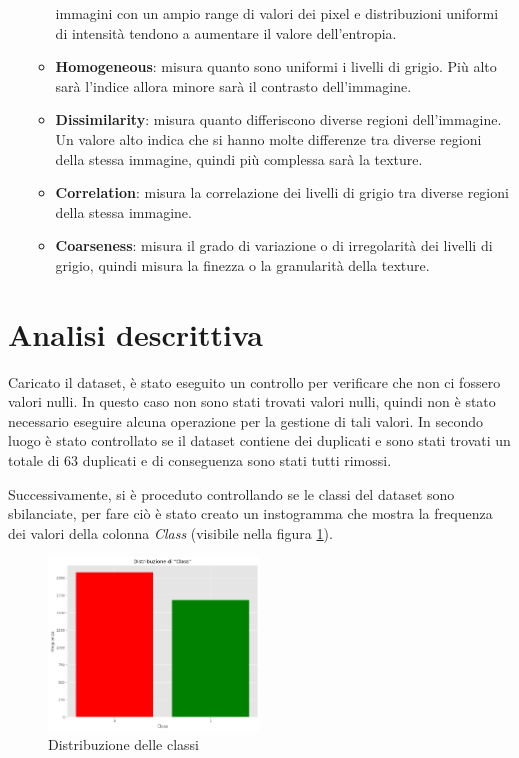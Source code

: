 \begin{enumerate}
\begin{itemize}
                  immagini con un ampio range di valori dei pixel e distribuzioni
                  uniformi di intensità tendono a aumentare il valore dell'entropia.
                  \item \textbf{Homogeneous}: misura quanto sono uniformi i livelli 
                  di grigio. Più alto sarà l'indice allora minore sarà il contrasto 
                  dell'immagine.
                  \item \textbf{Dissimilarity}: misura quanto differiscono diverse 
                  regioni dell'immagine. Un valore alto indica che si hanno molte
                  differenze tra diverse regioni della stessa immagine, quindi più 
                  complessa sarà la texture.
                  \item \textbf{Correlation}: misura la correlazione dei livelli 
                  di grigio tra diverse regioni della stessa immagine. 
                  \item \textbf{Coarseness}: misura il grado di variazione o di 
                  irregolarità dei livelli di grigio, quindi misura la finezza o
                  la granularità della texture.
            \end{itemize}
\end{enumerate}

\section{Analisi descrittiva}\label{sec:analisi-descrittiva}

Caricato il dataset, è stato eseguito un controllo per verificare che non ci fossero
valori nulli. In questo caso non sono stati trovati valori nulli, quindi non è
stato necessario eseguire alcuna operazione per la gestione di tali valori. In
secondo luogo è stato controllato se il dataset contiene dei duplicati e sono stati
trovati un totale di $63$ duplicati e di conseguenza sono stati tutti rimossi.

Successivamente, si è proceduto controllando se le classi del dataset sono sbilanciate,
per fare ciò è stato creato un instogramma che mostra la frequenza dei valori 
della colonna \textit{Class} (visibile nella figura \ref{fig:dist-classi}).

\begin{figure}[!h]
      \centering
      \includegraphics[width=0.5\textwidth]{img/analisi/distribuzioneClassi.png}
      \caption{Distribuzione delle classi}
      \label{fig:dist-classi}
\end{figure}

